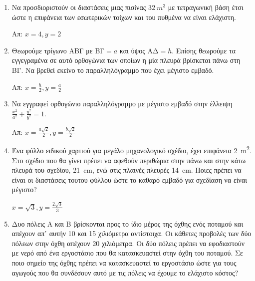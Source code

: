 




\everymath{\displaystyle}
\thispagestyle{askhseis}



\begin{center}
  \minibox{\large \bfseries \textcolor{Col1}{Προβλήματα Ακροτάτων}}
\end{center}

\vspace{\baselineskip}

\begin{enumerate}

	\item Να προσδιοριστούν οι διαστάσεις μιας πισίνας 
    $ \SI{32}{m^{3}} $ με τετραγωνική βάση έτσι ώστε η επιφάνεια των εσωτερικών 
    τοίχων και του πυθμένα να είναι ελάχιστη. 

		\hfill Απ: $x=4, y=2$

	\item Θεωρούμε τρίγωνο ΑΒΓ με  ΒΓ$=a $ και ύψος ΑΔ$=h$. Επίσης θεωρούμε τα
		εγγεγραμένα σε αυτό ορθογώνια των οποίων η μία πλευρά βρίσκεται πάνω στη
		ΒΓ. Να βρεθεί εκείνο το παραλληλόγραμμο που έχει μέγιστο εμβαδό.
		
		\hfill Απ: $ x = \frac{h}{2}, y= \frac{a}{2} $

	\item Να εγγραφεί ορθογώνιο παραλληλόγραμμο με μέγιστο εμβαδό στην έλλειψη $
		\frac{x^{2}}{a^{2}} + \frac{y^{2}}{b^{2}} = 1 $. 

		\hfill Απ: $ x = \frac{a\sqrt{2}}{2}, y = \frac{b \sqrt{2}}{2} $

	\item Ένα φύλλο ειδικού χαρτιού για μεγάλο μηχανολογικό σχέδιο, έχει
		επιφάνεια \SI{2}{m^{2}}. Στο σχέδιο που θα γίνει πρέπει να αφεθούν
		περιθώρια στην πάνω και στην κάτω πλευρά του σχεδίου, \SI{21}{cm}, ενώ
		στις πλαινές πλευρές \SI{14}{cm}. Ποιες πρέπει να είναι οι διαστάσεις
		τουτου φύλλου ώστε το καθαρό εμβαδό για σχεδίαση να είναι μέγιστο?

		\hfill $ x = \sqrt{3}, y = \frac{2 \sqrt{3}}{3} $

	\item Δυο πόλεις Α και Β βρίσκονται προς το ίδιο μέρος της όχθης ενός
		ποταμού και απέχουν απ᾽ αυτήν 10 και 15 χιλιόμετρα αντίστοιχα. Οι
		κάθετες προβολές των δύο πόλεων στην όχθη απέχουν 20 χιλιόμετρα. Οι δύο
		πόλεις πρέπει να εφοδιαστούν με νερό από ένα εργοστάσιο που θα
		κατασκευαστεί στην όχθη του ποταμού. Σε ποιο σημείο της όχθης πρέπει να
		κατασκευαστεί το εργοστάσιο ώστε για τους αγωγούς που θα συνδέσουν αυτό
		με τις πόλεις να έχουμε το ελάχιστο κόστος?


\end{enumerate}
